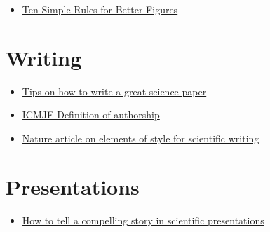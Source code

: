 \documentclass[
]{book}
\providecommand{\tightlist}{%
  \setlength{\itemsep}{0pt}\setlength{\parskip}{0pt}}
\begin{document}
\begin{itemize}
\tightlist
\item
  \href{https://journals.plos.org/ploscompbiol/article?id=10.1371/journal.pcbi.1003833}{Ten Simple Rules for Better Figures}
\end{itemize}

\hypertarget{writing}{%
\section{Writing}\label{writing}}

\begin{itemize}
\tightlist
\item
  \href{https://www.nature.com/articles/d41586-019-02918-5}{Tips on how to write a great science paper}
\item
  \href{http://www.icmje.org/recommendations/browse/roles-and-responsibilities/defining-the-role-of-authors-and-contributors.html}{ICMJE Definition of authorship}
\item
  \href{https://www.nature.com/articles/nphys724}{Nature article on elements of style for scientific writing}
\end{itemize}

\hypertarget{presentations}{%
\section{Presentations}\label{presentations}}

\begin{itemize}
\tightlist
\item
  \href{https://www.nature.com/articles/d41586-021-03603-2}{How to tell a compelling story in scientific presentations}
\end{itemize}

  
\end{document}
